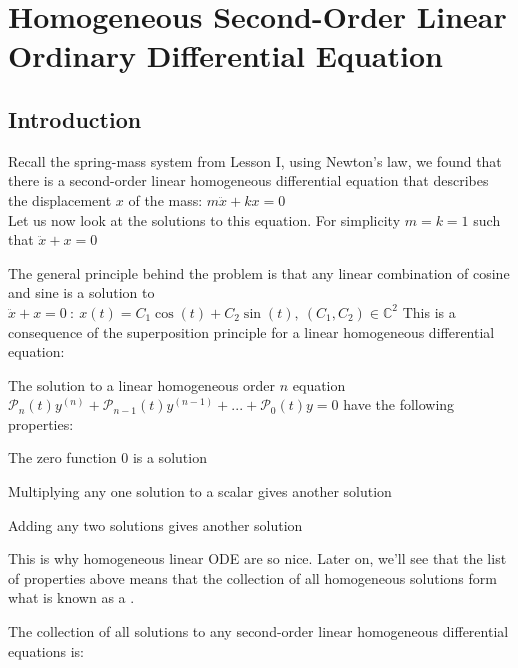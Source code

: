 \documentclass[11pt, openright]{book}
\begin{document}
\newpage

\section{Homogeneous Second-Order Linear Ordinary Differential Equation}

\subsection{Introduction}

Recall the spring-mass system from Lesson I, using Newton's law, we found that there is a second-order linear homogeneous differential equation that describes the displacement $x$ of the mass: $m\ddot{x}+kx=0$\\
Let us now look at the solutions to this equation. For simplicity $m=k=1$ such that $\ddot{x}+x=0$

The general principle behind the problem is that any linear combination of cosine and sine is a solution to $\ddot{x}+x=0\ :\ x(t)=C_1\cos(t)+C_2\sin(t),\ (C_1,C_2)\in\mathbb{C}^2$
This is a consequence of the superposition principle for a linear homogeneous differential equation:
\begin{dent}{}
    The solution to a linear homogeneous order $n$ equation $\mathcal{P}_n(t)y^{(n)}+\mathcal{P}_{n-1}(t)y^{(n-1)}+...+\mathcal{P}_0(t)y=0$
    have the following properties:
    \begin{items}{-13pt}{0pt}
        \item The zero function $0$ is a solution
        \item Multiplying any one solution to a scalar gives another solution
        \item Adding any two solutions gives another solution
    \end{items}
\end{dent}


This is why homogeneous linear ODE are so nice. Later on, we'll see that the list of properties above means that the collection of all homogeneous solutions form what is known as a .

The collection of all solutions to any second-order linear homogeneous differential equations is:
\end{document}
